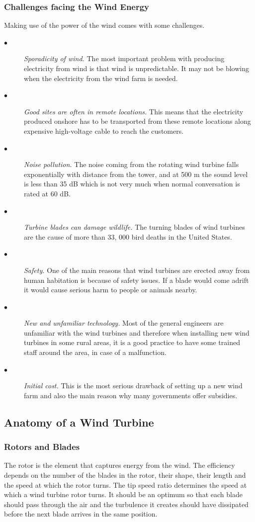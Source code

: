 \documentclass[twosided,a4,10pt]{article}
\begin{document}
\begin{multicols}{2}
 \subsubsection{Challenges facing the Wind Energy} Making use of the power of the wind comes with some challenges.
 \begin{description}
 	\item[$\bullet$]
 	\textit{Sporadicity of wind.} The most important problem with producing electricity from wind is that wind is unpredictable. It may not be blowing when the electricity from the wind farm is needed.  
 	\item[$\bullet$]
 	\textit{Good sites are often in remote locations.} This means that the electricity produced onshore has to be transported from these remote locations along expensive high-voltage cable to reach the customers.
 	\item[$\bullet$]
 	\textit{Noise pollution.} The noise coming from the rotating wind turbine falls exponentially with distance from the tower, and at 500 m the sound level is less than 35 dB which is not very much when normal conversation is rated at 60 dB.
 	\item[$\bullet$]
 	\textit{Turbine blades can damage wildlife.} The turning blades of wind turbines are the cause of more than 33, 000 bird deaths in the United States.
 	\item[$\bullet$]
 	\textit{Safety.} One of the main reasons that wind turbines are erected away from human habitation is because of safety issues. If a blade would come adrift it would cause serious harm to people or animals nearby.
 	\item[$\bullet$]
 	\textit{New and unfamiliar technology.} Most of the general engineers are unfamiliar with the wind turbines and therefore when installing new wind turbines in some rural areas, it is a good practice to have some trained staff around the area, in case of a malfunction.
 	\item[$\bullet$]
 	\textit{Initial cost.} This is the most serious drawback of setting up a new wind farm and also the main reason why many governments offer subsidies.
 	
 \end{description}

\subsection{Anatomy of a Wind Turbine}
 \subsubsection{Rotors and Blades}
 The rotor is the element that captures energy from the wind. The efficiency depends on the number of the blades in the rotor, their shape, their length and the speed at which the rotor turns. The tip speed ratio determines the speed at which a wind turbine rotor turns. It should be an optimum so that each blade should pass through the air and the turbulence it creates should have dissipated before the next blade arrives in the same position.


\end{multicols}
\end{document}
